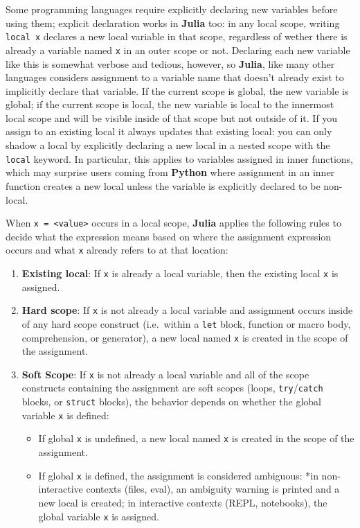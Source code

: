 \documentclass[
]{article}
\providecommand{\tightlist}{%
  \setlength{\itemsep}{0pt}\setlength{\parskip}{0pt}}
\begin{document}
Some programming languages require explicitly declaring new variables
before using them; explicit declaration works in \textbf{Julia} too: in
any local scope, writing \texttt{local\ x} declares a new local variable
in that scope, regardless of wether there is already a variable named
\texttt{x} in an outer scope or not. Declaring each new variable like
this is somewhat verbose and tedious, however, so \textbf{Julia}, like
many other languages considers assignment to a variable name that
doesn't already exist to implicitly declare that variable. If the
current scope is global, the new variable is global; if the current
scope is local, the new variable is local to the innermost local scope
and will be visible inside of that scope but not outside of it. If you
assign to an existing local it always updates that existing local: you
can only shadow a local by explicitly declaring a new local in a nested
scope with the \texttt{local} keyword. In particular, this applies to
variables assigned in inner functions, which may surprise users coming
from \textbf{Python} where assignment in an inner function creates a new local
unless the variable is explicitly declared to be non-local.

When \texttt{x\ =\ \textless{}value\textgreater{}} occurs in a local
scope, \textbf{Julia} applies the following rules to decide what the
expression means based on where the assignment expression occurs and
what \texttt{x} already refers to at that location:

\begin{enumerate}
\def\labelenumi{\arabic{enumi}.}
\tightlist
\item
  \textbf{Existing local}: If \texttt{x} is already a local variable,
  then the existing local \texttt{x} is assigned.
\item
  \textbf{Hard scope}: If \texttt{x} is not already a local variable and
  assignment occurs inside of any hard scope construct (i.e.~within a
  \texttt{let} block, function or macro body, comprehension, or
  generator), a new local named \texttt{x} is created in the scope of
  the assignment.
\item
  \textbf{Soft Scope}: If \texttt{x} is not already a local variable and
  all of the scope constructs containing the assignment are soft scopes
  (loops, \texttt{try}/\texttt{catch} blocks, or \texttt{struct}
  blocks), the behavior depends on whether the global variable
  \texttt{x} is defined:

  \begin{itemize}
  \tightlist
  \item
    If global \texttt{x} is undefined, a new local named \texttt{x} is
    created in the scope of the assignment.
  \item
    If global \texttt{x} is defined, the assignment is considered
    ambiguous: *in non-interactive contexts (files, eval), an ambiguity
    warning is printed and a new local is created; in interactive
    contexts (REPL, notebooks), the global variable \texttt{x} is
    assigned.
  \end{itemize}
\end{enumerate}
\end{document}

